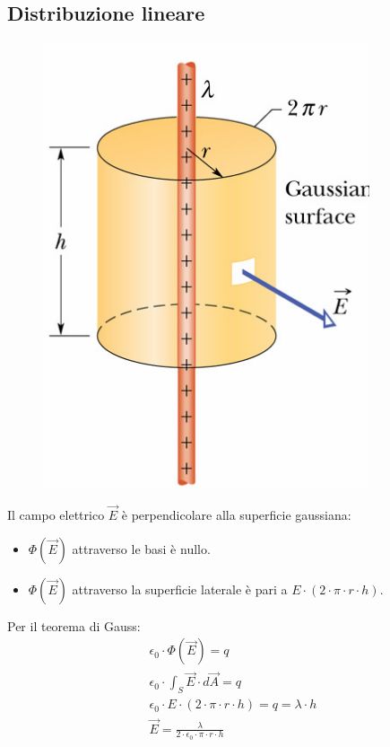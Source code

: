 \subsection{Distribuzione lineare}
    \begin{figure}[h!]
    	\centering
    	\includegraphics[scale=0.4]{Pictures/esempio3.png}
    \end{figure}
Il campo elettrico $\vec{E}$ è perpendicolare alla superficie gaussiana:
	\begin{itemize}
    	\item{$\Phi(\vec{E})$ attraverso le basi è nullo.}
        \item{$\Phi(\vec{E})$ attraverso la superficie laterale è pari a $E \cdot (2 \cdot \pi \cdot r \cdot h)$.}
    \end{itemize}
Per il teorema di Gauss:
	\begin{displaymath}\begin{aligned}
		\epsilon_0 \cdot \Phi(\vec{E}) = q\\
        \epsilon_0 \cdot \int_S \vec{E} \cdot d\vec{A} = q\\
        \epsilon_0 \cdot E \cdot (2 \cdot \pi \cdot r \cdot h) = q = \lambda \cdot h\\
        \vec{E} = \frac{\lambda}{2 \cdot \epsilon_0 \cdot \pi \cdot r \cdot h}
	\end{aligned}\end{displaymath}
  
